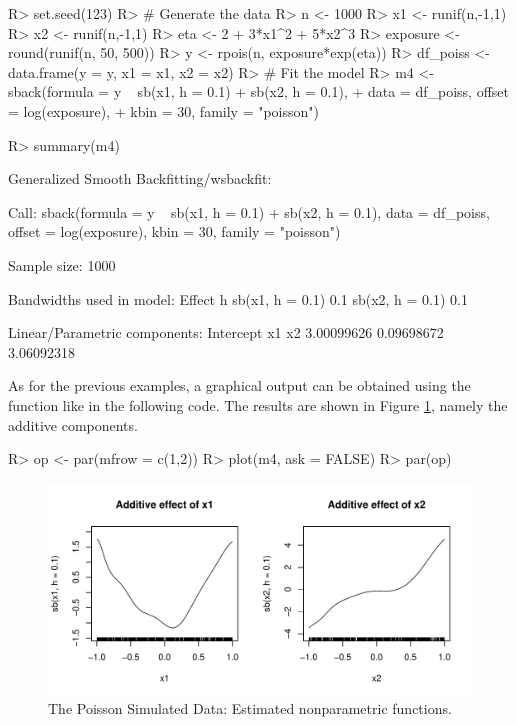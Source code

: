 \begin{Schunk}
\begin{Sinput}
R> set.seed(123)
R> # Generate the data
R> n <- 1000
R> x1 <- runif(n,-1,1)
R> x2 <- runif(n,-1,1)
R> eta <- 2 + 3*x1^2 + 5*x2^3
R> exposure <- round(runif(n, 50, 500))
R> y <- rpois(n, exposure*exp(eta))
R> df_poiss <- data.frame(y = y, x1 = x1, x2 = x2)
R> # Fit the model
R> m4 <- sback(formula = y ~ sb(x1, h = 0.1) + sb(x2, h = 0.1), 
+	data = df_poiss, offset = log(exposure), 
+	kbin = 30, family = "poisson")

R> summary(m4)
\end{Sinput}
\begin{Soutput}
Generalized Smooth Backfitting/wsbackfit:

Call: sback(formula = y ~ sb(x1, h = 0.1) + sb(x2, h = 0.1), data = df_poiss, 
    offset = log(exposure), kbin = 30, family = "poisson")

Sample size: 1000 

Bandwidths used in model:
 Effect          h  
 sb(x1, h = 0.1) 0.1
 sb(x2, h = 0.1) 0.1

Linear/Parametric components:
 Intercept         x1         x2 
3.00099626 0.09698672 3.06092318
\end{Soutput}
\end{Schunk}

As for the previous examples, a graphical output can be obtained using the   function like in the following code. The results are shown in Figure \ref{fig-simul-3}, namely the additive components.

\begin{Schunk}
\begin{Sinput}
R> op <- par(mfrow = c(1,2))
R> plot(m4, ask = FALSE)
R> par(op)
\end{Sinput}
\end{Schunk}

\begin{figure}[htb]
\vspace{-0.25cm} 
\centering 
\includegraphics[width=14cm]{Poisson_Plot.pdf}  
\vspace{-0.9cm}
\caption{The Poisson Simulated Data: Estimated nonparametric functions. %
\label{fig-simul-3} }
\end{figure}



